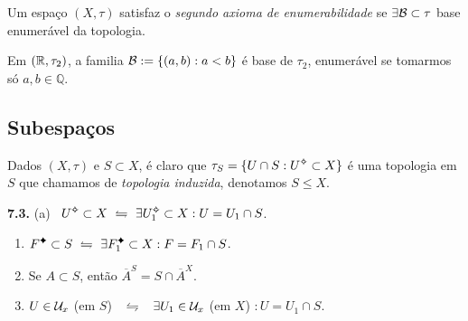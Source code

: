\begin{definition}[AN2]
    Um espaço \((X, \tau)\) satisfaz o \emph{segundo axioma de enumerabilidade} se \(\exists \mathcal{B}\subset \tau\) base enumerável da topologia.  
\end{definition}

\begin{example}
    Em \((\mathbb{R}, \tau_2)\), a familia \(\mathcal{B} := \{(a,b) : a < b\}\) é base de \(\tau_2\), enumerável se tomarmos só \(a,b \in \mathbb{Q}\).  
\end{example}



\subsection*{Subespaços}

\begin{definition}
    Dados \((X,\tau )\) e \(S\subset X\), é claro que \(\tau_S = \{U \cap S : U\ab \subset X\}\) é uma topologia em \(S\) que chamamos de \emph{topologia induzida}, denotamos \(S\leq X\). 
\end{definition}

\begin{proposition}
    \textbf{7.3.} (a) \ \(U\ab\subset X \ \leftrightharpoons \ \exists U_1\ab \subset X : U = U_1 \cap S\). 
    \vspace{-0.25cm}
    \begin{enumerate}[label = (\alph*), left = 0.6cm]
        \item[(b)] \(F\ce \subset S \ \leftrightharpoons \ \exists F_1\ce \subset X : F = F_1 \cap S\). 
        \item[(c)] Se \(A \subset S\), então \(\overline{A}^S = S \cap \overline{A}^X\). 
        \item[(d)] \(U \in \mathcal{U}_x\) (em \(S\)) \ \(\leftrightharpoons \) \ \( \exists U_1 \in \mathcal{U}_x\) (em \(X\)) \( : U = U_1 \cap S\). 
    \end{enumerate}
\end{proposition}

